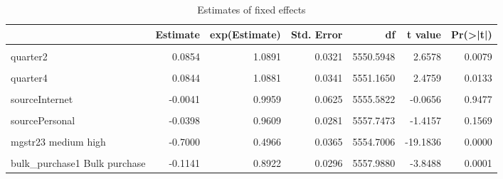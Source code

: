 \documentclass[
  11pt,
]{article}
\begin{document}
\begin{table}[!h]

\caption{\label{tab:unnamed-chunk-60}Estimates of fixed effects}
\centering
\begin{tabular}[t]{l|r|r|r|r|r|r}
\hline
  & Estimate & exp(Estimate) & Std. Error & df & t value & Pr(>|t|)\\
\hline
\cellcolor{gray!6}{(Intercept)} & \cellcolor{gray!6}{-0.6346} & \cellcolor{gray!6}{0.5301} & \cellcolor{gray!6}{0.0393} & \cellcolor{gray!6}{296.1819} & \cellcolor{gray!6}{-16.1290} & \cellcolor{gray!6}{0.0000}\\
\hline
quarter2 & 0.0854 & 1.0891 & 0.0321 & 5550.5948 & 2.6578 & 0.0079\\
\hline
\cellcolor{gray!6}{quarter3} & \cellcolor{gray!6}{0.0841} & \cellcolor{gray!6}{1.0877} & \cellcolor{gray!6}{0.0332} & \cellcolor{gray!6}{5555.0726} & \cellcolor{gray!6}{2.5349} & \cellcolor{gray!6}{0.0113}\\
\hline
quarter4 & 0.0844 & 1.0881 & 0.0341 & 5551.1650 & 2.4759 & 0.0133\\
\hline
\cellcolor{gray!6}{sourceHeard it} & \cellcolor{gray!6}{0.0633} & \cellcolor{gray!6}{1.0653} & \cellcolor{gray!6}{0.0335} & \cellcolor{gray!6}{5556.1197} & \cellcolor{gray!6}{1.8904} & \cellcolor{gray!6}{0.0588}\\
\hline
sourceInternet & -0.0041 & 0.9959 & 0.0625 & 5555.5822 & -0.0656 & 0.9477\\
\hline
\cellcolor{gray!6}{sourceInternet Pharmacy} & \cellcolor{gray!6}{-0.3227} & \cellcolor{gray!6}{0.7242} & \cellcolor{gray!6}{0.1016} & \cellcolor{gray!6}{5548.9347} & \cellcolor{gray!6}{-3.1743} & \cellcolor{gray!6}{0.0015}\\
\hline
sourcePersonal & -0.0398 & 0.9609 & 0.0281 & 5557.7473 & -1.4157 & 0.1569\\
\hline
\cellcolor{gray!6}{mgstr22 medium} & \cellcolor{gray!6}{-0.3816} & \cellcolor{gray!6}{0.6827} & \cellcolor{gray!6}{0.0279} & \cellcolor{gray!6}{5549.1951} & \cellcolor{gray!6}{-13.6631} & \cellcolor{gray!6}{0.0000}\\
\hline
mgstr23 medium high & -0.7000 & 0.4966 & 0.0365 & 5554.7006 & -19.1836 & 0.0000\\
\hline
\cellcolor{gray!6}{mgstr24 high} & \cellcolor{gray!6}{-1.1197} & \cellcolor{gray!6}{0.3264} & \cellcolor{gray!6}{0.0420} & \cellcolor{gray!6}{5559.7107} & \cellcolor{gray!6}{-26.6889} & \cellcolor{gray!6}{0.0000}\\
\hline
bulk\_purchase1 Bulk purchase & -0.1141 & 0.8922 & 0.0296 & 5557.9880 & -3.8488 & 0.0001\\
\hline
\end{tabular}
\end{table}
\end{document}
